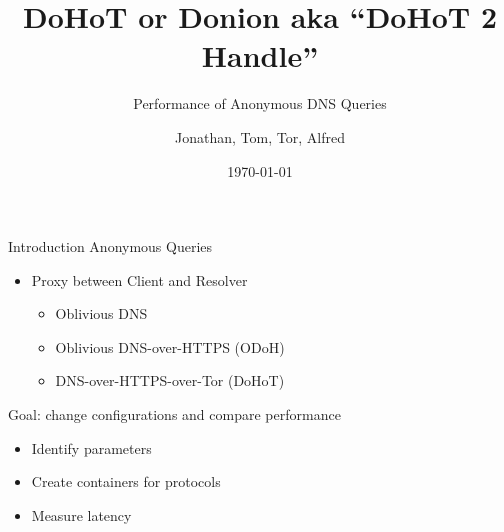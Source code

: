 \documentclass[xcolor=x11names,dvipsnames,aspectratio=169]{beamer}
\title{\huge DoHoT or Donion aka ``DoHoT 2 Handle''}
\subtitle{Performance of Anonymous DNS Queries}
\author{\small Jonathan, Tom, Tor, Alfred}
\date{\today}
\begin{document}
    \setcounter{showProgressBar}{0}
	\setcounter{showSlideNumbers}{0}

	\frame{\titlepage}

	\setcounter{framenumber}{0}
	\setcounter{showProgressBar}{1}
	\setcounter{showSlideNumbers}{1}

    \begin{frame}{Introduction}
        Anonymous Queries
        \begin{itemize}
            \item Proxy between Client and Resolver
            \begin{itemize}
                \item Oblivious DNS
                \item Oblivious DNS-over-HTTPS (ODoH)
                \item DNS-over-HTTPS-over-Tor (DoHoT)
            \end{itemize}
        \end{itemize}
        \vspace{1em}
        Goal: change configurations and compare performance
        \begin{itemize}
            \item Identify parameters
            \item Create containers for protocols
            \item Measure latency
        \end{itemize}
    \end{frame}
\end{document}

